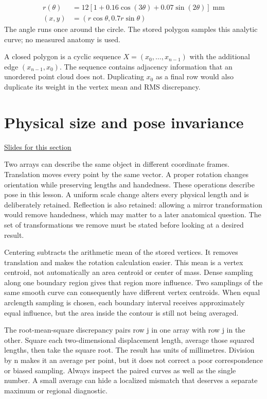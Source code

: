 \documentclass[11pt,letterpaper]{article}
\theoremstyle{definition}\newtheorem{definition}{Definition}\newtheorem{example}{Example}
\numberwithin{equation}{section}
\begin{document}
\[
\begin{aligned}r(\theta)&=12[1+0.16\cos(3\theta)+0.07\sin(2\theta)]\;\mathrm{mm}\\(x,y)&=(r\cos\theta,0.7r\sin\theta)\end{aligned}
\]
The angle runs once around the circle. The stored polygon samples this analytic curve; no measured anatomy is used.

A closed polygon is a cyclic sequence $X=(x_0,\ldots,x_{n-1})$ with the additional edge $(x_{n-1},x_0)$. The sequence contains adjacency information that an unordered point cloud does not. Duplicating $x_0$ as a final row would also duplicate its weight in the vertex mean and RMS discrepancy.

\section{Physical size and pose invariance}
\hypertarget{note-physical-size-and-pose-invariance}{}\label{note:physical-size-and-pose-invariance}
{\small \href{slides.html\#frame=corresponding-point-rms\&step=1}{Slides for this section}}\par
Two arrays can describe the same object in different coordinate frames. Translation moves every point by the same vector. A proper rotation changes orientation while preserving lengths and handedness. These operations describe pose in this lesson. A uniform scale change alters every physical length and is deliberately retained. Reflection is also retained: allowing a mirror transformation would remove handedness, which may matter to a later anatomical question. The set of transformations we remove must be stated before looking at a desired result.

Centering subtracts the arithmetic mean of the stored vertices. It removes translation and makes the rotation calculation easier. This mean is a vertex centroid, not automatically an area centroid or center of mass. Dense sampling along one boundary region gives that region more influence. Two samplings of the same smooth curve can consequently have different vertex centroids. When equal arclength sampling is chosen, each boundary interval receives approximately equal influence, but the area inside the contour is still not being averaged.

The root-mean-square discrepancy pairs row j in one array with row j in the other. Square each two-dimensional displacement length, average those squared lengths, then take the square root. The result has units of millimetres. Division by n makes it an average per point, but it does not correct a poor correspondence or biased sampling. Always inspect the paired curves as well as the single number. A small average can hide a localized mismatch that deserves a separate maximum or regional diagnostic.
\end{document}
